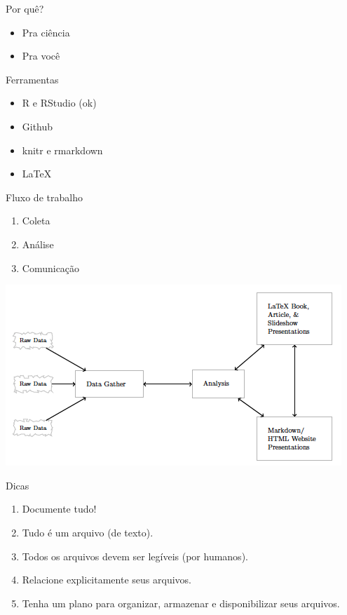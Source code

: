 \documentclass[
  10pt,
  ignorenonframetext,
]{beamer}
\begin{document}
\begin{frame}{Por quê?}
\protect\hypertarget{por-quuxea}{}
\begin{itemize}
\item
  Pra ciência
\item
  Pra você
\end{itemize}
\end{frame}

\begin{frame}{Ferramentas}
\protect\hypertarget{ferramentas}{}
\begin{itemize}
\item
  R e RStudio (ok)
\item
  Github
\item
  knitr e rmarkdown
\item
  LaTeX
\end{itemize}
\end{frame}

\begin{frame}{Fluxo de trabalho}
\protect\hypertarget{fluxo-de-trabalho}{}
\begin{enumerate}
\item
  Coleta
\item
  Análise
\item
  Comunicação
\end{enumerate}
\end{frame}

\begin{frame}{}
\protect\hypertarget{section-11}{}
\begin{center}\includegraphics[width=1\linewidth]{imgs/fluxo_gandrud} \end{center}
\end{frame}

\begin{frame}{Dicas}
\protect\hypertarget{dicas}{}
\begin{enumerate}
\item
  Documente tudo!
\item
  Tudo é um arquivo (de texto).
\item
  Todos os arquivos devem ser legíveis (por humanos).
\item
  Relacione explicitamente seus arquivos.
\item
  Tenha um plano para organizar, armazenar e disponibilizar seus
  arquivos.
\end{enumerate}
\end{frame}
\end{document}
